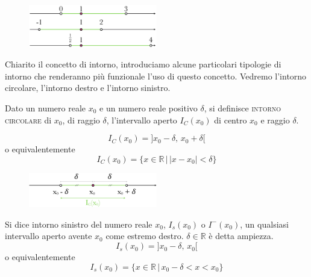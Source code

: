 \begin{figure}[htpb!]
\centering
\includegraphics[width=0.5\textwidth]{img/top_7.png}%
  \end{figure}
  
Chiarito il concetto di intorno, introduciamo alcune particolari tipologie di 
intorno che renderanno più funzionale l'uso di questo concetto. Vedremo 
l'intorno circolare, l'intorno destro e l'intorno sinistro.\\

\begin{definizione}
  Dato un numero reale $x_0$ e un numero reale positivo $\delta$, si 
definisce \textsc{intorno circolare} di $x_0$, di raggio $\delta$, 
l'intervallo aperto $I_C(x_0)$ di centro $x_0$ e raggio $\delta$.\\
\end{definizione}

\begin{equation}
  I_C(x_0)=]x_0-\delta,\,x_0+\delta[
\end{equation}
o equivalentemente
 \begin{equation}
  I_C(x_0)=\{x\in \mathbb{R}\,\vert\,\vert x-x_0\vert<\delta\}
\end{equation}

\begin{figure}[htpb!]
  \centering
  \includegraphics[width=0.5\textwidth]{img/top_2.png}%
\end{figure}


\begin{definizione}
  Si dice intorno sinistro del numero reale $x_0$, $I_s(x_0)$ o 
$I^-(x_0)$, un qualsiasi intervallo aperto avente $x_0$ come estremo destro. 
$\delta\in\mathbb{R}$ è detta ampiezza.\\
\begin{equation}
  I_s(x_0)=]x_0-\delta,\,x_0[
\end{equation}
o equivalentemente
\begin{equation}
  I_s(x_0)=\{x\in \mathbb{R}\,\vert\, x_0-\delta < x<x_0\}
\end{equation}
\end{definizione}

